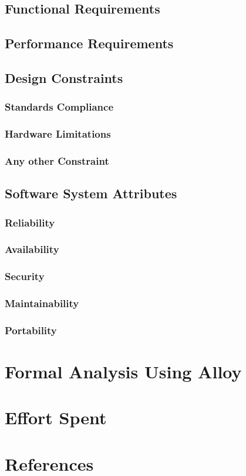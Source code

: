 \documentclass[a4paper]{article}
\begin{document}
\subsection{Functional Requirements}

\subsection{Performance Requirements}

\subsection{Design Constraints}

\subsubsection{Standards Compliance}

\subsubsection{Hardware Limitations}

\subsubsection{Any other Constraint}

\subsection{Software System Attributes}

\subsubsection{Reliability}

\subsubsection{Availability}

\subsubsection{Security}

\subsubsection{Maintainability}

\subsubsection{Portability}

\section{Formal Analysis Using Alloy}

\section{Effort Spent}

\section{References}
\end{document}
